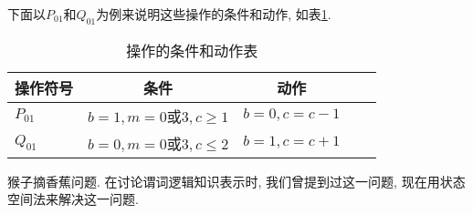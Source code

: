 \begin{result}
下面以$P_{01}$和$Q_{01}$为例来说明这些操作的条件和动作, 如表\ref{Tabexam4.1}.
\begin{table}
\begin{center}
\caption{操作的条件和动作表}
\label{Tabexam4.1}
\begin{tabular}{lcccc}
\hline
操作符号                  &  条件                                                                              &  动作\\
\hline
$P_{01}$     &  $b=1, m=0$或$3, c\geq 1$        &  $b=0, c=c-1$\\
$Q_{01}$     &  $b=0, m=0$或$3, c\leq 2 $         &  $b=1, c=c+1$\\
\hline
\end{tabular}
\end{center}
\end{table}
\end{result}
\begin{example}
    猴子摘香蕉问题. 在讨论谓词逻辑知识表示时, 我们曾提到过这一问题, 现在用状态空间法来解决这一问题.
\end{example}
